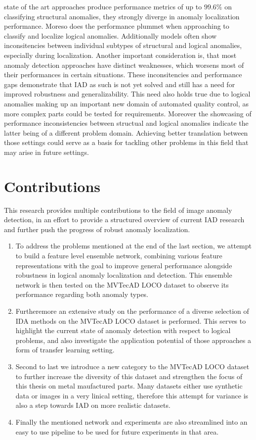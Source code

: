 state of the art approaches produce performance metrics of up to $99.6 \% $ on classifying structural anomalies, they 
strongly diverge in anomaly localization performance. Moreso does the performance plummet when approaching to classify and localize logical 
anomalies. Additionally models often show inconsitencies between individual subtypes of structural and logical anomalies, especially during 
localization. Another important consideration is, that most anomaly detection approaches have distinct weaknesses, which worsens most 
of their performances in certain situations. These inconsitencies and performance gaps demonstrate that IAD as such is not yet solved and still has a need for improved 
robustness and generalizability. This need also holds true due to logical anomalies making up an important new domain of automated 
quality control, as more complex parts could be tested for requirements. Moreover the showcasing of performance inconsistencies between 
structual and logical anomalies indicate the latter being of a different problem domain. Achieving better translation between those 
settings could serve as a basis for tackling other problems in this field that may arise in future settings.


\section{Contributions}
\label{sec:contributions}
This research provides multiple contributions to the field of image anomaly detection, in an effort to provide a structured overview of current IAD research and 
further push the progress of robust anomaly localization. 

\begin{enumerate}
  \item To address the problems mentioned at the end of the last section, we attempt 
  to build a feature level ensemble network, combining various feature representations with the goal to improve 
  general performance alongside robustness in logical anomaly localization and detection. This ensemble network is then tested on 
  the MVTecAD LOCO dataset to observe its performance regarding both anomaly types.
  \item Furtheremore an extensive study on the performance of a diverse selection of IDA methods on the MVTecAD LOCO dataset is performed. 
  This serves to highlight the current state of anomaly detection with respect to logical problems, and also investigate the application potential of 
  those approaches a form of transfer learning setting.
  \item Second to last we introduce a new category to the MVTecAD LOCO dataset to further increase the diversity of this dataset and strengthen the focus 
  of this thesis on metal maufactured parts. Many datasets either use synthetic data or images in a very linical setting, therefore this 
  attempt for variance is also a step towards IAD on more realistic datasets.
  \item Finally the mentioned network and experiments are also streamlined into an easy to use pipeline 
  to be used for future experiments in that area.
\end{enumerate}

